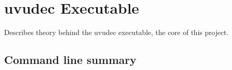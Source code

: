 \section{uvudec Executable}
Describes theory behind the uvudec executable, the core of this project.

\subsection{Command line summary}
\label{sec::uvudec::command_line}




% 


\begin{comment}

Usage: ./uvudec <args>
Args:
--verbose: verbose output.  Equivilent to --verbose=3
--verbose=<level>: set verbose level.  0 (none) - 3 (most)
--verbose-init: for selectivly debugging configuration file reading
--verbose-analysis: for selectivly debugging code analysis
--verbose-processing: for selectivly debugging code post-analysis
--verbose-printing: for selectivly debugging print routine
--config-language=<language>: default config interpreter language (plugins may require specific)
        python: use Python
        javascript: use javascript
--addr-min=<min>: minimum analysis address
--addr-max=<max>: maximum analysis address
--addr-exclude-min=<min>: minimum exclusion address
--addr-exclude-max=<max>: maximum exclusion address
--addr-comment: put comments on addresses
--addr-label: label addresses for jumping
--analysis-only[=<bool>]: only do analysis, don't print data
--analysis-address=<address>: only output analysis data for specified address
--flow-analysis=<type>: how to trace jump, calls
        linear: start at beginning, read all instructions linearly, then find jump/calls (default)
        trace: start at all vectors, analyze all segments called/branched recursivly
--opcode-usage: opcode usage count table
--analysis-dir=<dir>: create skeleton data suitible for stored analysis
--input=<file name>: source for data
--output=<file name>: output program (default: stdout)
--debug=<file name>: debug output (default: stdout)
--print-jumped-addresses=<bool>: whether to print information about jumped to addresses (*1)
--print-called-addresses=<bool>: whether to print information about called to addresses (*1)
--useless-ascii-art: append nifty ascii art headers to output files
--help: print this message and exit
--version: print version and exit

Special files: -: stdin
<bool>:
        true includes case insensitive "true", non-zero numbers (ie 1)
        false includes case insensitve "false", 0

*1: WARNING: currently slow, may be fixed in future releases

\end{comment}

